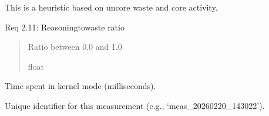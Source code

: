 \documentclass[letterpaper,10pt,english]{sphinxmanual}
\begin{document}
\begin{fulllineitems}
\begin{fulllineitems}
\sphinxAtStartPar
This is a heuristic based on uncore waste and core activity.

\sphinxAtStartPar
Req 2.11: Reasoning\sphinxhyphen{}to\sphinxhyphen{}waste ratio
\begin{quote}\begin{description}
\sphinxAtStartPar
Ratio between 0.0 and 1.0

\sphinxAtStartPar
float

\end{description}\end{quote}

\end{fulllineitems}


\begin{fulllineitems}
\label{\detokenize{core.models.energy_measurement:core.models.energy_measurement.EnergyMeasurement.kernel_time_ms}}
\pysigstartsignatures
\pysigline
{}
\pysigstopsignatures
\sphinxAtStartPar
Time spent in kernel mode (milliseconds).

\end{fulllineitems}


\begin{fulllineitems}
\label{\detokenize{core.models.energy_measurement:core.models.energy_measurement.EnergyMeasurement.measurement_id}}
\pysigstartsignatures
\pysigline
{}
\pysigstopsignatures
\sphinxAtStartPar
Unique identifier for this measurement (e.g., ‘meas\_20260220\_143022’).

\end{fulllineitems}



\end{fulllineitems}
\end{document}
